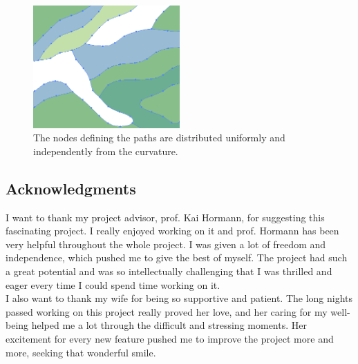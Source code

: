 \documentclass[]{usiinfbachelorproject}
\begin{document}
\begin{figure}[ht]
	\centering
	\includegraphics[width=0.5\textwidth]{img/illustrator_nodes.png}
	\caption{The nodes defining the paths are distributed uniformly and independently from the curvature.}
	\label{fig:illustratornodes}
\end{figure}

\subsection{Acknowledgments}

I want to thank my project advisor, prof. Kai Hormann, for suggesting this fascinating project. I really enjoyed working on it and prof. Hormann has been very helpful throughout the whole project. I was given a lot of freedom and independence, which pushed me to give the best of myself. The project had such a great potential and was so intellectually challenging that I was thrilled and eager every time I could spend time working on it.\\
I also want to thank my wife for being so supportive and patient. The long nights passed working on this project really proved her love, and her caring for my well-being helped me a lot through the difficult and stressing moments. Her excitement for every new feature pushed me to improve the project more and more, seeking that wonderful smile.



\end{document}
